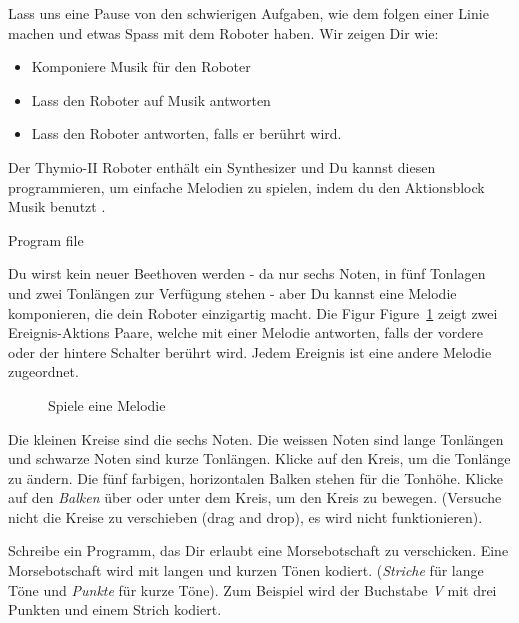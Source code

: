 \label{ch.bells}

Lass uns eine Pause von den schwierigen Aufgaben,
wie dem folgen einer Linie machen
und etwas Spass mit dem Roboter haben.
Wir zeigen Dir wie:

\begin{itemize}
\item Komponiere Musik für den Roboter
\item Lass den Roboter auf Musik antworten
\item Lass den Roboter antworten, falls er berührt wird.
\end{itemize}


Der Thymio-II Roboter enthält ein Synthesizer
und Du kannst diesen programmieren,
um einfache Melodien zu spielen,
indem du den Aktionsblock Musik benutzt .

{\raggedleft \hfill Program file }

Du wirst kein neuer Beethoven werden
- da nur sechs Noten, in fünf Tonlagen und zwei Tonlängen zur Verfügung stehen -
aber Du kannst eine Melodie komponieren, die dein Roboter einzigartig macht. 
Die Figur Figure~\ref{fig.music} zeigt zwei Ereignis-Aktions Paare,
welche mit einer Melodie antworten,
falls der vordere oder der hintere Schalter berührt wird.
Jedem Ereignis ist eine andere Melodie zugeordnet.

\begin{figure}
\begin{center}
\caption{Spiele eine Melodie}
\label{fig.music}
\end{center}
\end{figure}

Die kleinen Kreise sind die sechs Noten.
Die weissen Noten sind lange Tonlängen
und schwarze Noten sind kurze Tonlängen.
Klicke auf den Kreis, um die Tonlänge zu ändern.
Die fünf farbigen, horizontalen Balken stehen für die Tonhöhe.
Klicke auf den \emph{Balken} über oder unter dem Kreis, um den Kreis zu bewegen. 
(Versuche nicht die Kreise zu verschieben (drag and drop), es wird nicht funktionieren). 


Schreibe ein Programm,
das Dir erlaubt eine Morsebotschaft zu verschicken.
Eine Morsebotschaft wird mit langen und kurzen Tönen kodiert.
(\emph{Striche} für lange Töne und \emph{Punkte} für kurze Töne).
Zum Beispiel wird der Buchstabe \emph{V} mit drei Punkten und einem Strich kodiert.



